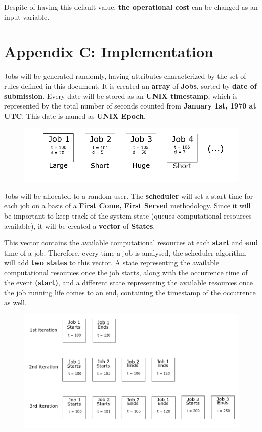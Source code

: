 \documentclass{scrreprt}
\begin{document}
Despite of having this default value, \textbf{the operational cost} can be changed as an input variable.

\section{Appendix C: Implementation}

\par Jobs will be generated randomly, having attributes characterized by the set of rules defined in this document. It is created an \textbf{array} of \textbf{Jobs}, sorted by \textbf{date of submission}. Every date will be stored as an \textbf{UNIX timestamp}, which is represented by the total number of seconds counted from \textbf{January 1st, 1970 at UTC}. This date is named as \textbf{UNIX Epoch}.

\begin{figure}[!htb]
  \centering
  \includegraphics[width=\linewidth]{jobs.png}
\end{figure}

\par Jobs will be allocated to a random user. The \textbf{scheduler} will set a start time for each job on a basis of a \textbf{First Come, First Served} methodology. Since it will be important to keep track of the system state (queues computational resources available), it will be created a \textbf{vector} of \textbf{States}. 
\par This vector contains the available computational resources at each \textbf{start} and \textbf{end} time of a job. Therefore, every time a job is analysed, the scheduler algorithm will add \textbf{two states} to this vector. A state representing the available computational resources once the job starts, along with the occurrence time of the event \textbf{(start)}, and a different state representing the available resources once the job running life comes to an end, containing the timestamp of the occurrence as well.

\begin{figure}[!htb]
  \centering
  \includegraphics[width=\linewidth]{iterations.png}
\end{figure}
\end{document}
